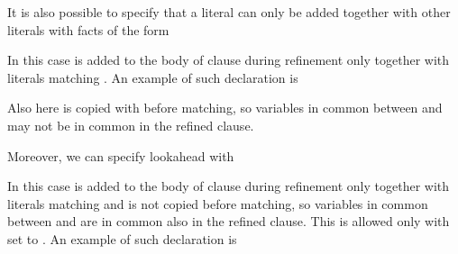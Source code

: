 \documentclass[letterpaper,10pt,english]{sphinxmanual}
\begin{document}
\sphinxAtStartPar
It is also possible to specify that a literal can only be added together with other literals with facts of the form

\begin{sphinxVerbatim}[commandchars=\\\{\}]
  
\end{sphinxVerbatim}

\sphinxAtStartPar
In this case  is added to the body of clause during refinement only together with literals matching .
An example of such declaration is

\begin{sphinxVerbatim}[commandchars=\\\{\}]
\PYG{p}{[}\PYG{p}{]}
\end{sphinxVerbatim}

\sphinxAtStartPar
Also here  is copied with  before matching, so variables in common between  and  may not be in common in the refined clause.

\sphinxAtStartPar
Moreover, we can specify lookahead with

\begin{sphinxVerbatim}[commandchars=\\\{\}]
  
\end{sphinxVerbatim}

\sphinxAtStartPar
In this case  is added to the body of clause during refinement only together with literals matching  and  is not copied before matching, so variables in common between  and  are in common also in the refined clause. This is allowed only with  set to .
An example of such declaration is
\end{document}
